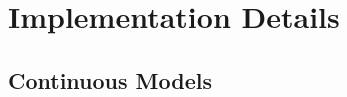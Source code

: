 \begin{table}[ht]
    \centering

    \caption{Computation time per basic unit (ms)}
    
    \label{tab:basic time}
\end{table}













































\section{Implementation Details}

\subsection{Continuous Models}\label{app:implement details of music}


